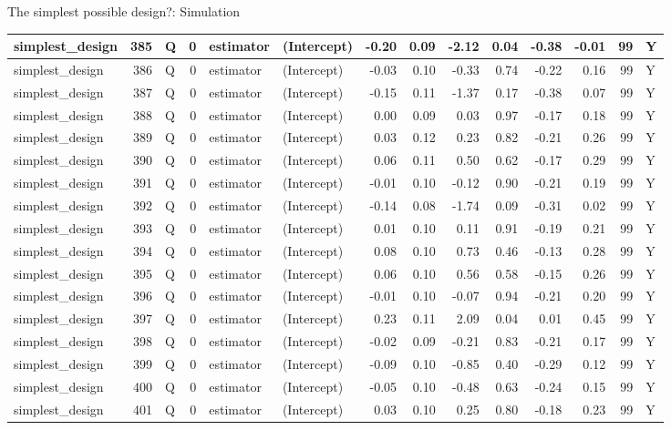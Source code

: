 \documentclass[
  11pt,
  ignorenonframetext,
]{beamer}
\begin{document}
\begin{frame}[fragile]{The simplest possible design?: Simulation}
\begin{tabular}{l|r|l|r|l|l|r|r|r|r|r|r|r|l}
\hline
simplest\_design & 385 & Q & 0 & estimator & (Intercept) & -0.20 & 0.09 & -2.12 & 0.04 & -0.38 & -0.01 & 99 & Y\\
\hline
simplest\_design & 386 & Q & 0 & estimator & (Intercept) & -0.03 & 0.10 & -0.33 & 0.74 & -0.22 & 0.16 & 99 & Y\\
\hline
simplest\_design & 387 & Q & 0 & estimator & (Intercept) & -0.15 & 0.11 & -1.37 & 0.17 & -0.38 & 0.07 & 99 & Y\\
\hline
simplest\_design & 388 & Q & 0 & estimator & (Intercept) & 0.00 & 0.09 & 0.03 & 0.97 & -0.17 & 0.18 & 99 & Y\\
\hline
simplest\_design & 389 & Q & 0 & estimator & (Intercept) & 0.03 & 0.12 & 0.23 & 0.82 & -0.21 & 0.26 & 99 & Y\\
\hline
simplest\_design & 390 & Q & 0 & estimator & (Intercept) & 0.06 & 0.11 & 0.50 & 0.62 & -0.17 & 0.29 & 99 & Y\\
\hline
simplest\_design & 391 & Q & 0 & estimator & (Intercept) & -0.01 & 0.10 & -0.12 & 0.90 & -0.21 & 0.19 & 99 & Y\\
\hline
simplest\_design & 392 & Q & 0 & estimator & (Intercept) & -0.14 & 0.08 & -1.74 & 0.09 & -0.31 & 0.02 & 99 & Y\\
\hline
simplest\_design & 393 & Q & 0 & estimator & (Intercept) & 0.01 & 0.10 & 0.11 & 0.91 & -0.19 & 0.21 & 99 & Y\\
\hline
simplest\_design & 394 & Q & 0 & estimator & (Intercept) & 0.08 & 0.10 & 0.73 & 0.46 & -0.13 & 0.28 & 99 & Y\\
\hline
simplest\_design & 395 & Q & 0 & estimator & (Intercept) & 0.06 & 0.10 & 0.56 & 0.58 & -0.15 & 0.26 & 99 & Y\\
\hline
simplest\_design & 396 & Q & 0 & estimator & (Intercept) & -0.01 & 0.10 & -0.07 & 0.94 & -0.21 & 0.20 & 99 & Y\\
\hline
simplest\_design & 397 & Q & 0 & estimator & (Intercept) & 0.23 & 0.11 & 2.09 & 0.04 & 0.01 & 0.45 & 99 & Y\\
\hline
simplest\_design & 398 & Q & 0 & estimator & (Intercept) & -0.02 & 0.09 & -0.21 & 0.83 & -0.21 & 0.17 & 99 & Y\\
\hline
simplest\_design & 399 & Q & 0 & estimator & (Intercept) & -0.09 & 0.10 & -0.85 & 0.40 & -0.29 & 0.12 & 99 & Y\\
\hline
simplest\_design & 400 & Q & 0 & estimator & (Intercept) & -0.05 & 0.10 & -0.48 & 0.63 & -0.24 & 0.15 & 99 & Y\\
\hline
simplest\_design & 401 & Q & 0 & estimator & (Intercept) & 0.03 & 0.10 & 0.25 & 0.80 & -0.18 & 0.23 & 99 & Y\\

\end{tabular}
\end{frame}
\end{document}
